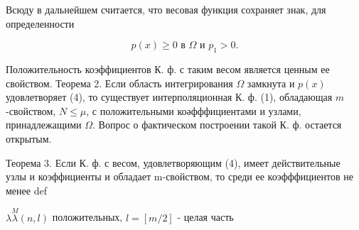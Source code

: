\documentclass[10pt]{article}
\begin{document}
Всюду в дальнейшем считается, что весовая функция сохраняет знак, для определенности



\[

p(x) \geqslant 0 \text { в } \Omega \text { и } p_{1}>0 .

\]



Положительность коэффициентов К. ф. с таким весом является ценным ее свойством. Теорема 2. Если область интегрирования $\Omega$ замкнута и $p(x)$ удовлетворяет (4), то существует интерполяционная К. ф. (1), обладающая $m$-свойством, $N \leqslant \mu$, с положительными коәфффициентами и узлами, принадлежащими $\Omega$. Вопрос о фактическом построении такой $К$. ф. остается открытым.



Теорема 3. Если К. ф. с весом, удовлетворяющим (4), имеет действительные узлы и коэффициенты и обладает m-свойством, то среди ее коэфффициентов не менее def



$\lambda \stackrel{M}{\lambda}(n, l)$ положительных, $l=[m / 2]$ - целая часть
\end{document}
